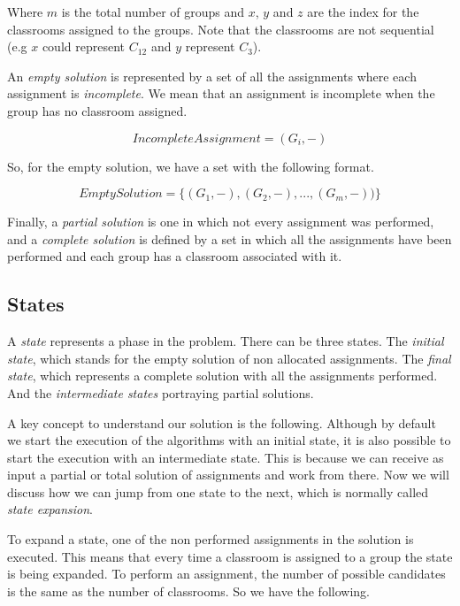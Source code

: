 Where $m$ is the total number of groups and $x$, $y$ and $z$ are the index for the classrooms assigned to the groups. Note that the classrooms are not sequential (e.g $x$ could represent $C_{12}$ and $y$ represent $C_{3}$).

An \textit{empty solution} is represented by a set of all the assignments where each assignment is \textit{incomplete}. We mean that an assignment is incomplete when the group has no classroom assigned.

\begin{equation}
    IncompleteAssignment = (G_{i}, -)
\end{equation}

So, for the empty solution, we have a set with the following format.

\begin{equation}
    EmptySolution = \{ (G_{1}, -), (G_{2}, -), ..., (G_{m}, -)) \}
\end{equation}

Finally, a \textit{partial solution} is one in which not every assignment was performed, and a \textit{complete solution} is defined by a set in which all the assignments have been performed and each group has a classroom associated with it.

\subsection{States}

A \textit{state} represents a phase in the problem. There can be three states. The \textit{initial state}, which stands for the empty solution of non allocated assignments. The \textit{final state}, which represents a complete solution with all the assignments performed. And the \textit{intermediate states} portraying partial solutions.

A key concept to understand our solution is the following. Although by default we start the execution of the algorithms with an initial state, it is also possible to start the execution with an intermediate state. This is because we can receive as input a partial or total solution of assignments and work from there. Now we will discuss how we can jump from one state to the next, which is normally called \textit{state expansion}.

To expand a state, one of the non performed assignments in the solution is executed. This means that every time a classroom is assigned to a group the state is being expanded. To perform an assignment, the number of possible candidates is the same as the number of classrooms. So we have the following.

